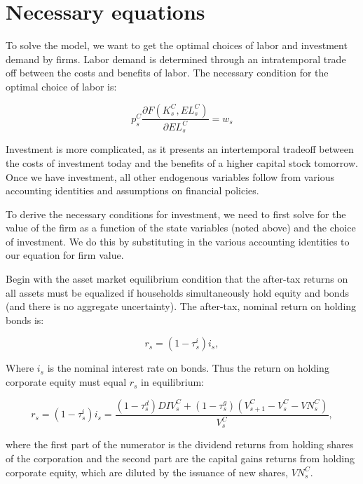 \section{Necessary equations}
To solve the model, we want to get the optimal choices of labor and investment demand by firms.  Labor demand is determined through an intratemporal trade off between the costs and benefits of labor.  The necessary condition for the optimal choice of labor is: 

\begin{equation}
\label{eqn:foc_l}
p^{C}_{s}\frac{\partial F(K^{C}_{s},EL^{C}_{s})}{\partial EL^{C}_{s}}=w_{s}
\end{equation}

Investment is more complicated, as it presents an intertemporal tradeoff between the costs of investment today and the benefits of a higher capital stock tomorrow.  Once we have investment, all other endogenous variables follow from various accounting identities and assumptions on financial policies.

To derive the necessary conditions for investment, we need to first solve for the value of the firm as a function of the state variables (noted above) and the choice of investment. We do this by substituting in the various accounting identities to our equation for firm value.

Begin with the asset market equilibrium condition that the after-tax returns on all assets must be equalized if households simultaneously hold equity and bonds (and there is no aggregate uncertainty).  The after-tax, nominal return on holding bonds is:

\begin{equation}
\label{eqn:r}
r_{s}=(1-\tau^{i}_{s})i_{s},
\end{equation}

\noindent\noindent Where $i_{s}$ is the nominal interest rate on bonds.  Thus the return on holding corporate equity must equal $r_{s}$ in equilibrium:

\begin{equation}
\label{eqn:equity_eqm}
r_{s}=(1-\tau^{i}_{s})i_{s}=\frac{(1-\tau^{d}_{s})DIV^{C}_{s}+(1-\tau^{g}_{s})(V^{C}_{s+1}-V^{C}_{s}-VN^{C}_{s})}{V^{C}_{s}},
\end{equation}

where the first part of the numerator is the dividend returns from holding shares of the corporation and the second part are the capital gains returns from holding corporate equity, which are diluted by the issuance of new shares, $VN^{C}_{s}$.

